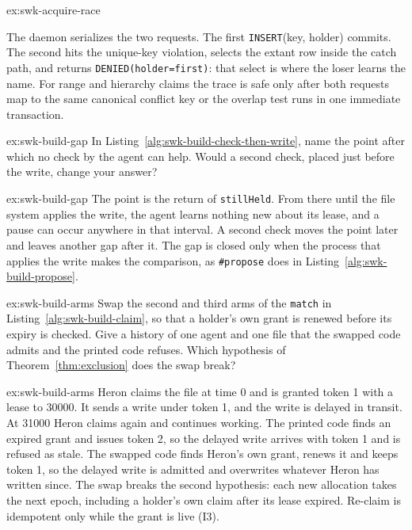 \documentclass[11pt,a4paper]{article}
\theoremstyle{definition}
\theoremstyle{remark}
\begin{document}
\begin{pdsolution}{ex:swk-acquire-race}
\begin{center}
\end{center}
\par\smallskip
The daemon serializes the two requests. The first \texttt{INSERT}\allowbreak(key, holder) commits. The second hits the unique-key violation, selects the extant row inside the catch path, and returns \texttt{DENIED}\allowbreak\texttt{(holder}\allowbreak\texttt{=first)}: that select is where the loser learns the name. For range and hierarchy claims the trace is safe only after both requests map to the same canonical conflict key or the overlap test runs in one immediate transaction.
\end{pdsolution}
\begin{pdexercise}[kind=Check,rating=1]{ex:swk-build-gap}
In Listing~\ref{alg:swk-build-check-then-write}, name the point after which no check by the agent can help. Would a second check, placed just before the write, change your answer?
\end{pdexercise}
\begin{pdsolution}{ex:swk-build-gap}
The point is the return of \texttt{stillHeld}. From there until the file system applies the write, the agent learns nothing new about its lease, and a pause can occur anywhere in that interval. A second check moves the point later and leaves another gap after it. The gap is closed only when the process that applies the write makes the comparison, as \texttt{\#propose} does in Listing~\ref{alg:swk-build-propose}.
\end{pdsolution}
\begin{pdexercise}[kind=Trace,rating=2]{ex:swk-build-arms}
Swap the second and third arms of the \texttt{match} in Listing~\ref{alg:swk-build-claim}, so that a holder's own grant is renewed before its expiry is checked. Give a history of one agent and one file that the swapped code admits and the printed code refuses. Which hypothesis of Theorem~\ref{thm:exclusion} does the swap break?
\end{pdexercise}
\begin{pdsolution}{ex:swk-build-arms}
Heron claims the file at time 0 and is granted token 1 with a lease to 30000. It sends a write under token 1, and the write is delayed in transit. At 31000 Heron claims again and continues working. The printed code finds an expired grant and issues token 2, so the delayed write arrives with token 1 and is refused as stale. The swapped code finds Heron's own grant, renews it and keeps token 1, so the delayed write is admitted and overwrites whatever Heron has written since. The swap breaks the second hypothesis: each new allocation takes the next epoch, including a holder's own claim after its lease expired. Re-claim is idempotent only while the grant is live (I3).
\end{pdsolution}
\end{document}
